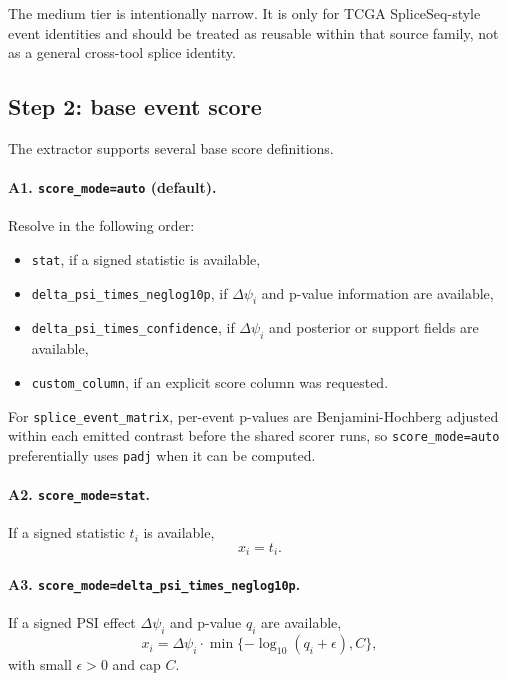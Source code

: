 \documentclass[11pt]{article}
\begin{document}
The medium tier is intentionally narrow. It is only for TCGA SpliceSeq-style event identities and should be treated as reusable within that source family, not as a general cross-tool splice identity.

\subsection{Step 2: base event score}
The extractor supports several base score definitions.

\paragraph{A1. \texttt{score\_mode=auto} (default).}
Resolve in the following order:
\begin{itemize}[leftmargin=2em]
\item \texttt{stat}, if a signed statistic is available,
\item \texttt{delta\_psi\_times\_neglog10p}, if $\Delta \psi_i$ and p-value information are available,
\item \texttt{delta\_psi\_times\_confidence}, if $\Delta \psi_i$ and posterior or support fields are available,
\item \texttt{custom\_column}, if an explicit score column was requested.
\end{itemize}

For \texttt{splice\_event\_matrix}, per-event p-values are Benjamini-Hochberg adjusted within each emitted contrast before the shared scorer runs, so \texttt{score\_mode=auto} preferentially uses \texttt{padj} when it can be computed.

\paragraph{A2. \texttt{score\_mode=stat}.}
If a signed statistic $t_i$ is available,
\[
x_i = t_i.
\]

\paragraph{A3. \texttt{score\_mode=delta\_psi\_times\_neglog10p}.}
If a signed PSI effect $\Delta \psi_i$ and p-value $q_i$ are available,
\begin{equation}
x_i = \Delta \psi_i \cdot \min\{-\log_{10}(q_i + \epsilon), C\},
\label{eq:dpsi_p}
\end{equation}
with small $\epsilon > 0$ and cap $C$.
\end{document}
